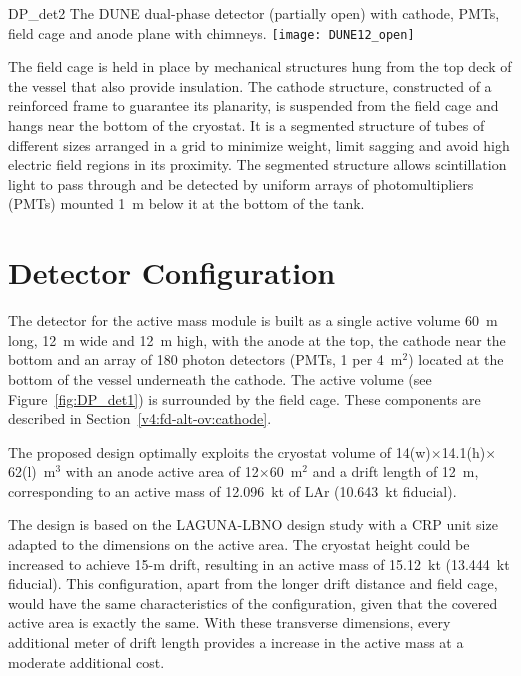 \begin{cdrfigure}{DP_det2}
{The DUNE dual-phase detector (partially open) with cathode, PMTs, field cage and anode plane with chimneys.}
\texttt{[image: DUNE12\_open]}
\end{cdrfigure}

The field cage is held in place by mechanical structures hung from the
top deck of the vessel that also provide insulation.  The cathode
structure, constructed of a reinforced frame to 
guarantee its planarity, is suspended from the field cage and hangs near the 
bottom of the cryostat. It is a segmented structure of tubes of different sizes 
arranged in a grid to minimize weight, limit sagging and avoid high electric field
regions in its proximity.  The segmented structure allows scintillation light to pass
through and be detected by uniform arrays of photomultipliers (PMTs) mounted
1~m below it at the bottom of the tank.

\section{Detector Configuration}

The detector for the  active mass module is built as a single
active volume 60~m long, 12~m wide and 12~m high, with the anode at the
top, the cathode near the bottom and an array of 180 photon detectors (PMTs, 1 per 4~m$^2$)
located at the bottom of the vessel underneath the cathode. 
The active volume (see Figure~\ref{fig:DP_det1}) is surrounded by the
field cage. These components are described in Section~\ref{v4:fd-alt-ov:cathode}.



The proposed design optimally exploits the
cryostat volume of 14(w)$\times$14.1(h)$\times$62(l)~m$^3$ with an
anode active area of 12$\times$60~m$^2$ and a drift length of 12~m,
corresponding to an active mass of 12.096~kt of LAr (10.643~kt
fiducial).  

 The design is based on the  LAGUNA-LBNO design study
with a CRP unit size adapted to the dimensions on the active area. The
cryostat height could be increased to achieve 15-m drift, resulting in
an active mass of 15.12~kt (13.444~kt fiducial).  This 
configuration, apart from the longer drift distance and field cage,
would have the same characteristics of the  configuration,
given that the covered active area is exactly the same. With these
transverse dimensions, every additional meter of drift length provides
a  increase in the active mass at a moderate additional cost.

